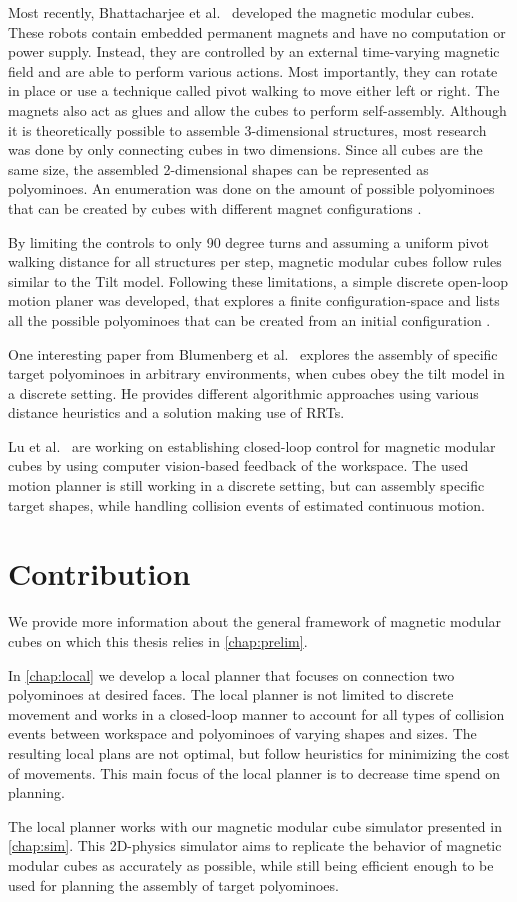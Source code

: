 Most recently, Bhattacharjee et al.\ \cite{Bhattacharjee2022} developed the magnetic modular cubes.
These robots contain embedded permanent magnets and have no computation or power supply.
Instead, they are controlled by an external time-varying magnetic field and are able to perform various actions.
Most importantly, they can rotate in place or use a technique called pivot walking to move either left or right.
The magnets also act as glues and allow the cubes to perform self-assembly.
Although it is theoretically possible to assemble 3-dimensional structures, most research was done by only connecting cubes in two dimensions.
Since all cubes are the same size, the assembled 2-dimensional shapes can be represented as polyominoes.
An enumeration was done on the amount of possible polyominoes that can be created by cubes with different magnet configurations \cite{Lu2021}.

By limiting the controls to only 90 degree turns and assuming a uniform pivot walking distance for all structures per step, magnetic modular cubes follow rules similar to the Tilt model.
Following these limitations, a simple discrete open-loop motion planer was developed, that explores a finite configuration-space and lists all the possible polyominoes that can be created from an initial configuration \cite{Bhattacharjee2022}.

One interesting paper from Blumenberg et al.\ \cite{blumenberg2023} explores the assembly of specific target polyominoes in arbitrary environments, when cubes obey the tilt model in a discrete setting.
He provides different algorithmic approaches using various distance heuristics and a solution making use of RRTs.

Lu et al.\ \cite{Lu2023} are working on establishing closed-loop control for magnetic modular cubes by using computer vision-based feedback of the workspace.
The used motion planner is still working in a discrete setting, but can assembly specific target shapes, while handling collision events of estimated continuous motion.


\section{Contribution}

We provide more information about the general framework of magnetic modular cubes on which this thesis relies in \autoref{chap:prelim}.

In \autoref{chap:local} we develop a local planner that focuses on connection two polyominoes at desired faces.
The local planner is not limited to discrete movement and works in a closed-loop manner to account for all types of collision events between workspace and polyominoes of varying shapes and sizes.
The resulting local plans are not optimal, but follow heuristics for minimizing the cost of movements.
This main focus of the local planner is to decrease time spend on planning.

The local planner works with our magnetic modular cube simulator presented in \autoref{chap:sim}.
This 2D-physics simulator aims to replicate the behavior of magnetic modular cubes as accurately as possible, while still being efficient enough to be used for planning the assembly of target polyominoes.


